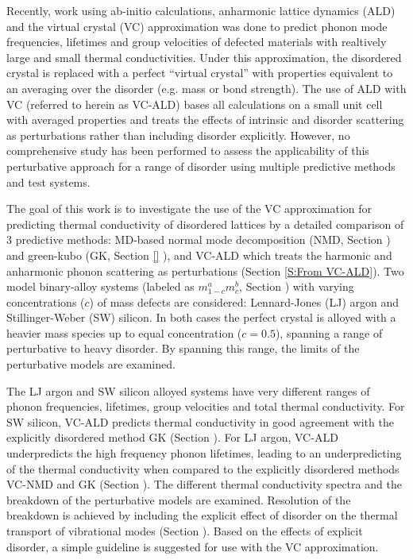 \documentclass[aps,prb,onecolumn,preprint,superscriptaddress,amsmath,amssymb,floatfix]{revtex4}
\begin{document}
Recently, work using ab-initio calculations, anharmonic 
lattice dynamics (ALD) and the virtual crystal (VC) 
approximation was done to predict phonon mode frequencies, lifetimes and 
group velocities of defected materials with realtively
large\cite{garg_role_2011,lindsay_thermal_2012} 
and 
small\cite{tian_phonon_2012} 
thermal conductivities. 
Under this approximation, the disordered 
crystal is replaced with a perfect “virtual crystal” with properties 
equivalent to an averaging over the disorder (e.g. mass or bond 
strength).\cite{abeles_lattice_1963}
The use of ALD with VC (referred to herein as VC-ALD) bases 
all calculations on a small unit cell with averaged properties and 
treats the effects of intrinsic and disorder scattering as perturbations 
rather than including disorder explicitly.
\cite{abeles_lattice_1963,tamura_isotope_1983,
tian_phonon_2012,lindsay_thermal_2012} 
However, no comprehensive study has been performed 
to assess the applicability of this perturbative approach for a range 
of disorder using multiple predictive methods and test systems.

The goal of this work is to investigate the use of the VC 
approximation for predicting thermal conductivity of disordered 
lattices by a detailed comparison 
of 3 predictive methods: MD-based normal mode 
decomposition (NMD, Section ) and green-kubo (GK, Section \ref{} ), 
and VC-ALD which treats the harmonic and 
anharmonic phonon scattering as perturbations 
(Section \ref{S:From VC-ALD}).  
Two model binary-alloy systems 
(labeled as $m^a_{1-c}m^b_{c}$, Section ) 
with varying concentrations ($c$) of mass defects  
are considered: 
Lennard-Jones (LJ) argon and Stillinger-Weber (SW) silicon. 
In both cases the perfect crystal is 
alloyed with a heavier mass species up to equal 
concentration ($c=0.5$), spanning 
a range of perturbative to heavy disorder. By spanning this range, 
the limits of the perturbative models are examined.

The LJ argon and SW silicon alloyed 
systems have very different ranges of phonon frequencies, 
lifetimes, group velocities and total thermal conductivity. 
For SW silicon, 
VC-ALD predicts thermal conductivity in good agreement with the 
explicitly disordered method GK (Section ). 
For LJ argon, VC-ALD underpredicts 
the high frequency phonon lifetimes, leading to an underpredicting of 
the thermal conductivity when compared to the explicitly disordered 
methods VC-NMD and GK (Section ). 
The different thermal conductivity spectra  
and the breakdown of the perturbative models are examined. Resolution 
of the breakdown is achieved by including the explicit effect of
disorder on the thermal transport of vibrational modes (Section ). Based 
on the effects of explicit disorder, a simple guideline is suggested 
for use with the VC approximation.
\end{document}
